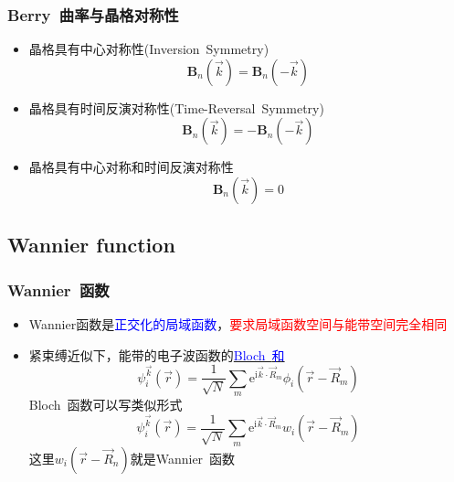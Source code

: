 {\frame
{
	\frametitle{\textrm{Berry~}曲率与晶格对称性}
	\begin{itemize}
		\item 晶格具有中心对称性\textrm{(Inversion~Symmetry)}
			\begin{displaymath}
				\mathbf{B}_n(\vec k)=\mathbf{B}_n(-\vec k)
			\end{displaymath}
		\item 晶格具有时间反演对称性\textrm{(Time-Reversal~Symmetry)}
			\begin{displaymath}
				\mathbf{B}_n(\vec k)=-\mathbf{B}_n(-\vec k)
			\end{displaymath}
		\item 晶格具有中心对称和时间反演对称性
			\begin{displaymath}
				\mathbf{B}_n(\vec k)=0
			\end{displaymath}
	\end{itemize}
}

\subsection{\rm{Wannier function}}
\frame
{
	\frametitle{\textrm{Wannier~}函数}
	\begin{itemize}
		\item \textrm{Wannier}函数是\textcolor{blue}{正交化的局域函数}，\textcolor{red}{要求局域函数空间与能带空间完全相同}
		\item 紧束缚近似下，能带的电子波函数的\underline{\textcolor{blue}{\textrm{Bloch~}和}}
			\begin{displaymath}
				\psi_i^{\vec k}(\vec r)=\frac1{\sqrt N}\sum_m\mathrm{e}^{\mathrm{i}\vec k\cdot\vec R_m}\phi_i(\vec r-\vec R_m)
			\end{displaymath}
		\textrm{Bloch~}函数可以写类似形式
		\begin{displaymath}
			\psi_i^{\vec k}(\vec r)=\frac1{\sqrt N}\sum_m\mathrm{e}^{\mathrm{i}\vec k\cdot\vec R_m}w_i(\vec r-\vec R_m) 
		\end{displaymath}
		这里$w_i(\vec r-\vec R_n)$就是\textrm{Wannier~}函数
	\end{itemize}
}

}
